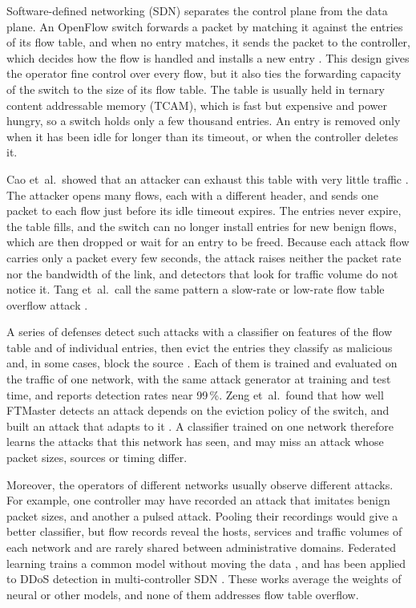 \documentclass[conference]{IEEEtran}
\begin{document}
Software-defined networking (SDN) separates the control plane from the data plane. An OpenFlow switch
forwards a packet by matching it against the entries of its flow table, and when no entry matches, it
sends the packet to the controller, which decides how the flow is handled and installs a new entry
\cite{mckeown2008openflow}. This design gives the operator fine control over every flow, but it also
ties the forwarding capacity of the switch to the size of its flow table. The table is usually held in
ternary content addressable memory (TCAM), which is fast but expensive and power hungry, so a switch
holds only a few thousand entries. An entry is removed only when it has been idle for longer than its
timeout, or when the controller deletes it.

Cao et~al.\ showed that an attacker can exhaust this table with very little traffic \cite{cao2017loft}.
The attacker opens many flows, each with a different header, and sends one packet to each flow just
before its idle timeout expires. The entries never expire, the table fills, and the switch can no longer
install entries for new benign flows, which are then dropped or wait for an entry to be freed. Because
each attack flow carries only a packet every few seconds, the attack raises neither the packet rate nor
the bandwidth of the link, and detectors that look for traffic volume do not notice it. Tang et~al.\
call the same pattern a slow-rate or low-rate flow table overflow attack \cite{tang2023sftoguard,tang2023ftmaster}.

A series of defenses detect such attacks with a classifier on features of the flow table and of
individual entries, then evict the entries they classify as malicious and, in some cases, block the
source \cite{tang2023sftoguard,tang2023ftmaster,tang2024ftodefender,tang2024ftop,mudgal2024flora,tang2025dmsbtt,jain2025ftshield}.
Each of them is trained and evaluated on the traffic of one network, with the same attack generator at
training and test time, and reports detection rates near 99\,\%. Zeng et~al.\ found that how well
FTMaster detects an attack depends on the eviction policy of the switch, and built an attack that adapts
to it \cite{zeng2024alfo}. A classifier trained on one network therefore learns the attacks that this
network has seen, and may miss an attack whose packet sizes, sources or timing differ.

Moreover, the operators of different networks usually observe different attacks. For example, one
controller may have recorded an attack that imitates benign packet sizes, and another a pulsed attack.
Pooling their recordings would give a better classifier, but flow records reveal the hosts, services and
traffic volumes of each network and are rarely shared between administrative domains. Federated learning
trains a common model without moving the data \cite{mcmahan2017fedavg}, and has been applied to DDoS
detection in multi-controller SDN \cite{fotse2025fedlad,alkhamisi2024fedsec,ali2023lrddos}. These works
average the weights of neural or other models, and none of them addresses flow table overflow.
\end{document}
